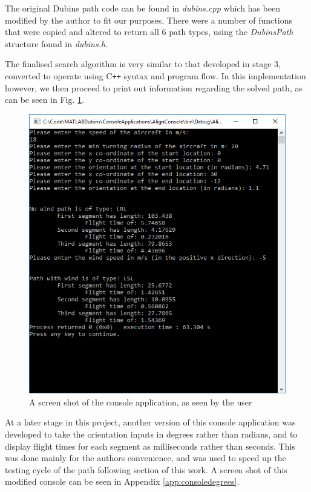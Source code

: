 The original Dubins path code can be found in \textit{dubins.cpp} which has been modified by the author to fit our purposes. There were a number of functions that were copied and altered to return all 6 path types, using the \textit{DubinsPath} structure found in \textit{dubins.h}. 

The finalised search algorithm is very similar to that developed in stage 3, converted to operate using C\texttt{++} syntax and program flow. In this implementation however, we then proceed to print out information regarding the solved path, as can be seen in Fig. \ref{fig:consoledemo}.

\begin{figure}%
\centering    
\includegraphics[width=\textwidth]{Console_Demo}
\caption[Screenshot of the finalised console application]{A screen shot of the console application, as seen by the user}
\label{fig:consoledemo}
\end{figure}

At a later stage in this project, another version of this console application was developed to take the orientation inputs in degrees rather than radians, and to display flight times for each segment as milliseconds rather than seconds. This was done mainly for the authors convenience, and was used to speed up the testing cycle of the path following section of this work. A screen shot of this modified console can be seen in Appendix \ref{app:consoledegrees}.

